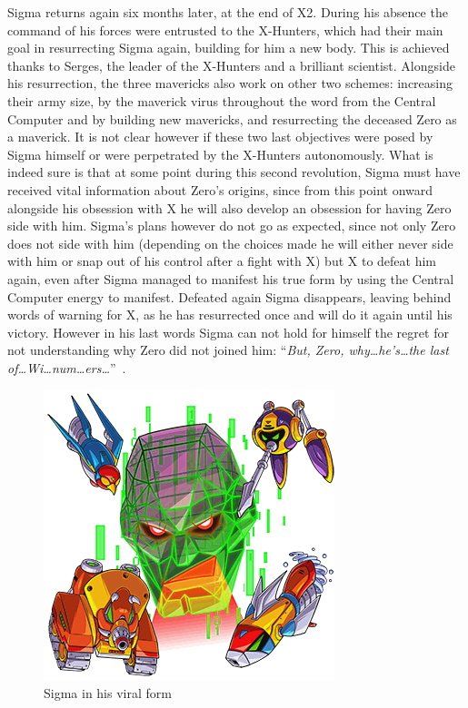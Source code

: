 Sigma returns again six months later, at the end of X2. During his absence the command of his forces were entrusted to the X-Hunters, which had their main goal in resurrecting Sigma again, building for him a new body. This is achieved thanks to Serges, the leader of the X-Hunters and a brilliant scientist. Alongside his resurrection, the three mavericks also work on other two schemes: increasing their army size, by the maverick virus throughout the word from the Central Computer and by building new mavericks, and resurrecting the deceased Zero as a maverick. It is not clear however if these two last objectives were posed by Sigma himself or were perpetrated by the X-Hunters autonomously. What is indeed sure is that at some point during this second revolution, Sigma must have received vital information about Zero's origins, since from this point onward alongside his obsession with X he will also develop an obsession for having Zero side with him. Sigma's plans however do not go as expected, since not only Zero does not side with him (depending on the choices made he will either never side with him or snap out of his control after a fight with X) but X  to defeat him again, even after Sigma managed to manifest his true form by using the Central Computer energy to manifest. Defeated again Sigma disappears, leaving behind words of warning for X, as he has resurrected once and will do it again until his victory. However in his last words Sigma can not hold for himself the regret for not understanding why Zero did not joined him: ``\textit{But, Zero, why…he’s…the last of…Wi…num…ers…}''~\cite{wordpress:X2_japanese_script}.
\begin{figure}[htp]
	\centering
	\includegraphics[height=\portraitsize]{figures/X2/Hunter_stages/Sigma_Virus.png}
	\caption{Sigma in his viral form}
\end{figure}

